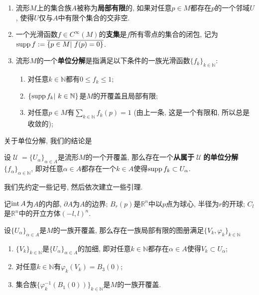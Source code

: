 \begin{defn}
    \begin{enumerate}[(1)]
        \item 流形$M$上的集合族$A$被称为\textbf{局部有限}的, 如果对任意$p\in M$都存在$p$的一个邻域$U$, 使得$U$仅与$A$中有限个集合的交非空.
        \item 一个光滑函数$f\in C^\infty(M)$的\textbf{支集}是$f$所有零点的集合的闭包, 记为$\supp{f}:=\overline{\{p\in M|\ f(p)=0\}}$.
        \item 流形$M$的一个\textbf{单位分解}是指满足以下条件的一族光滑函数$\{f_k\}_{k\in\mathbb{N}}$:
        \begin{enumerate}
            \item 对任意$k\in\mathbb{N}$都有$0\leq f_k\leq 1$;
            \item $\{\supp{f_k}|\ k\in\mathbb{N}\}$是$M$的开覆盖且局部有限;
            \item 对任意$p\in M$有$\displaystyle\sum_{k\in\mathbb{N}}f_k(p)=1$ (由上一条, 这是一个有限和, 所以总是收敛的);
        \end{enumerate}
    \end{enumerate}
\end{defn}

关于单位分解, 我们的结论是
\begin{thm}[单位分解定理]\label{partition of unity}
    设$\mscrU=\{U_\alpha\}_{\alpha\in A}$是流形$M$的一个开覆盖, 那么存在一个\textbf{从属于$\mscrU$的单位分解}$\{f_\alpha\}_{\alpha\in\mathbb{N}}$, 即对任意$\alpha\in A$都存在一个$k\in A$使得$\operatorname{supp}{f_k}\subset U_\alpha$.
\end{thm}

我们先约定一些记号, 然后依次建立一些引理.
\begin{sym}
    记$\operatorname{int}{A}$为$A$的内部, $\partial{A}$为$A$的边界;
    $B_r(p)$是$\mathbb{R}^n$中以$p$点为球心, 半径为$r$的开球;
    $C_l$是$\mathbb{R}^n$中的开立方体$(-l,l)^n$.
\end{sym}

\begin{lem}[流形的仿紧性]\label{paracompact}
    设$\{U_\alpha\}_{\alpha\in A}$是$M$的一族开覆盖, 那么存在一族局部有限的图册满足$\{V_k,\varphi_k\}_{k\in\mathbb{N}}$
    \begin{enumerate}[{\rm (1)}]
        \item $\{V_k\}_{k\in\mathbb{N}}$是$\{U_\alpha\}_{\alpha\in A}$的加细, 即对任意$k\in\mathbb{N}$都存在$\alpha\in A$使得$V_k\subset U_\alpha$;
        \item 对任意$k\in\mathbb{N}$有$\varphi_k(V_k)=B_3(0)$;
        \item 集合族$\{\varphi^{-1}_k(B_1(0))\}_{k\in\mathbb{N}}$是$M$的一族开覆盖.
    \end{enumerate}
\end{lem}

